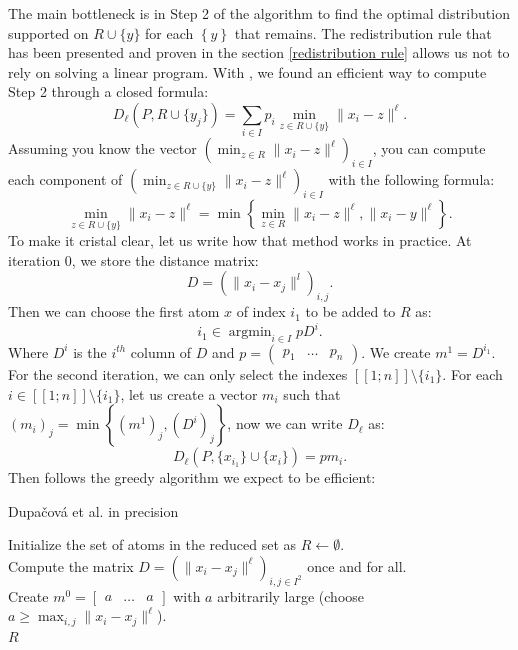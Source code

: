 \documentclass{amsart}
\newcommand{\argmin}{\mathop{\arg\min}}
\begin{document}
\noindent The main bottleneck is in Step 2 of the algorithm to find the optimal distribution supported on $R\cup\{y\}$ for each $\left\{y\right\}$ that remains. The redistribution rule that has been presented and proven in the section \ref{redistribution rule} allows us not to rely on solving a linear program. With , we found an efficient way to compute Step 2 through a closed formula: 
$$
D_\ell\left(P,R\cup \{y_j\}\right)=\sum_{i\in I}p_i\min_{z\in R\cup\{y\}}\lVert x_i-z \rVert^\ell.
$$
Assuming you know the vector $\left(\min_{z\in R}\lVert x_i-z \rVert^\ell\right)_{i\in I}$, you can compute each component of \newline$\left(\min_{z\in R\cup\{y\}}\lVert x_i-z \rVert^\ell\right)_{i\in I}$ with the following formula:
$$
    \min_{z\in R\cup\{y\}}\lVert x_i-z \rVert^\ell=\min\left\{\min_{z\in R}\lVert x_i-z \rVert^\ell, \lVert x_i-y \rVert^\ell\right\}.
$$
To make it cristal clear, let us write how that method works in practice. At iteration $0$, we store the distance matrix: 
$$
D = \left(\lVert x_i-x_j\rVert ^l \right)_{i,j}.
$$
Then we can choose the first atom $x$ of index $i_1$ to be added to $R$ as:
$$
i_1 \in \argmin_{i\in I} pD^i.
$$
Where $D^i$ is the $i^{th}$ column of $D$ and $p=\begin{pmatrix}
    p_1 & \hdots & p_n
\end{pmatrix}$.
We create $m^1=D^{i_1}$. For the second iteration, we can only select the indexes $[\![1;n]\!]\setminus \{i_1\}$. For each $i \in [\![1;n]\!]\setminus \{i_1\}$, let us create a vector $m_i$ such that $\left(m_i\right)_j=\min\left\{\left(m^1\right)_j,\left(D^i\right)_j\right\}$, now we can write $D_\ell$ as: $$
D_\ell\left(P,\{x_{i_1}\}\cup \{x_i\}\right)=pm_i.
$$
Then follows the greedy algorithm we expect to be efficient:
\begin{algorithm}
\caption{Dupačová et al. in precision}
Initialize the set of atoms in the reduced set as $R \gets \emptyset$.\\
Compute the matrix $D = \left(\| x_i - x_j \|^\ell\right)_{i,j \in I^2}$ once and for all.\\
Create $m^0 = \begin{bmatrix} a & \hdots & a \end{bmatrix}$ with $a$ arbitrarily large (choose $a \geq \max_{i,j} \lVert x_i - x_j \rVert^\ell$).\\
\Return $R$\\
\end{algorithm}
\end{document}
